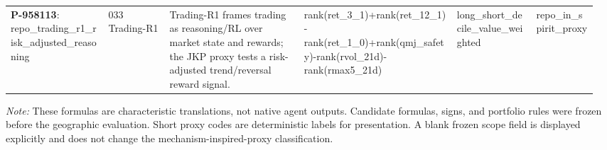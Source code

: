 \begin{longtable}{@{}L{0.16\linewidth}L{0.10\linewidth}L{0.22\linewidth}L{0.25\linewidth}L{0.13\linewidth}L{0.10\linewidth}@{}}
\textbf{P-958113}: repo\_\allowbreak{}trading\_\allowbreak{}r1\_\allowbreak{}risk\_\allowbreak{}adjusted\_\allowbreak{}reasoning & 033 Trading-R1 & Trading-R1 frames trading as reasoning/RL over market state and rewards; the JKP proxy tests a risk-adjusted trend/reversal reward signal. & rank(\allowbreak{}ret\_\allowbreak{}3\_\allowbreak{}1)\allowbreak{}+\allowbreak{}rank(\allowbreak{}ret\_\allowbreak{}12\_\allowbreak{}1)\allowbreak{}-\allowbreak{}rank(\allowbreak{}ret\_\allowbreak{}1\_\allowbreak{}0)\allowbreak{}+\allowbreak{}rank(\allowbreak{}qmj\_\allowbreak{}safety)\allowbreak{}-\allowbreak{}rank(\allowbreak{}rvol\_\allowbreak{}21d)\allowbreak{}-\allowbreak{}rank(\allowbreak{}rmax5\_\allowbreak{}21d)\allowbreak{} & long\_\allowbreak{}short\_\allowbreak{}decile\_\allowbreak{}value\_\allowbreak{}weighted & repo\_\allowbreak{}in\_\allowbreak{}spirit\_\allowbreak{}proxy \\
\end{longtable}
\par\footnotesize\color{Ink}\emph{Note:} These formulas are characteristic translations, not native agent outputs. Candidate formulas, signs, and portfolio rules were frozen before the geographic evaluation. Short proxy codes are deterministic labels for presentation. A blank frozen scope field is displayed explicitly and does not change the mechanism-inspired-proxy classification.
\endgroup

